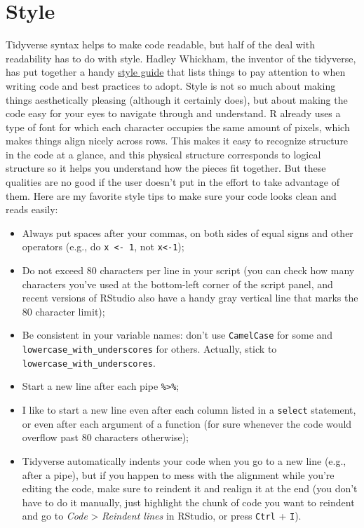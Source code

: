 \documentclass[
]{book}
\providecommand{\tightlist}{%
  \setlength{\itemsep}{0pt}\setlength{\parskip}{0pt}}
\begin{document}
\hypertarget{style}{%
\section{Style}\label{style}}

Tidyverse syntax helps to make code readable, but half of the deal with
readability has to do with style. Hadley Whickham, the inventor of the tidyverse,
has put together a handy \href{https://style.tidyverse.org/}{style guide} that lists
things to pay attention to when writing code and best practices to adopt. Style
is not so much about making things aesthetically pleasing (although it certainly
does), but about making the code easy for your eyes to navigate through and
understand. R already uses a type of font for which each character occupies the
same amount of pixels, which makes things align nicely across rows. This makes
it easy to recognize structure in the code at a glance, and this physical
structure corresponds to logical structure so it helps you understand how the
pieces fit together. But these qualities are no good if the user doesn't put in
the effort to take advantage of them. Here are my favorite style tips to make
sure your code looks clean and reads easily:

\begin{itemize}
\tightlist
\item
  Always put spaces after your commas, on both sides of equal signs and other
  operators (e.g., do \texttt{x\ \textless{}-\ 1}, not \texttt{x\textless{}-1});
\item
  Do not exceed 80 characters per line in your script (you can check how many
  characters you've used at the bottom-left corner of the script panel, and recent
  versions of RStudio also have a handy gray vertical line that marks the 80
  character limit);
\item
  Be consistent in your variable names: don't use \texttt{CamelCase} for some and
  \texttt{lowercase\_with\_underscores} for others. Actually, stick to \texttt{lowercase\_with\_underscores}.
\item
  Start a new line after each pipe \texttt{\%\textgreater{}\%};
\item
  I like to start a new line even after each column listed in a \texttt{select}
  statement, or even after each argument of a function (for sure whenever the code
  would overflow past 80 characters otherwise);
\item
  Tidyverse automatically indents your code when you go to a new line (e.g.,
  after a pipe), but if you happen to mess with the alignment while you're editing
  the code, make sure to reindent it and realign it at the end (you don't have to
  do it manually, just highlight the chunk of code you want to reindent and go to
  \emph{Code} \textgreater{} \emph{Reindent lines} in RStudio, or press \texttt{Ctrl} + \texttt{I}).
\end{itemize}
\end{document}

